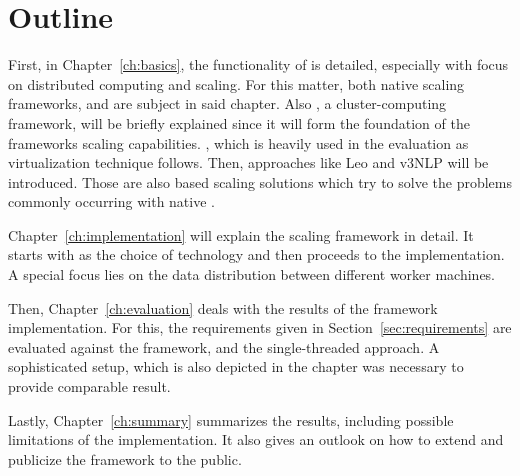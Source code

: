\section{Outline}
First, in Chapter~\ref{ch:basics}, the functionality of \uima{} is detailed, especially with focus on distributed computing and scaling. For this matter, both native \uima{} scaling frameworks, \uimaas{} and \cpe{} are subject in said chapter. Also \spark{}, a cluster-computing framework, will be briefly explained since it will form the foundation of the frameworks scaling capabilities. \docker{}, which is heavily used in the evaluation as virtualization technique follows. Then, approaches like Leo and v3NLP will be introduced. Those are also \uimaas{} based scaling solutions which try to solve the problems commonly occurring with native \uimaas{}.

Chapter~\ref{ch:implementation} will explain the scaling framework in detail. It starts with \spark{} as the choice of technology and then proceeds to the implementation. A special focus lies on the data distribution between different worker machines.

Then, Chapter~\ref{ch:evaluation} deals with the results of the framework implementation. For this, the requirements given in Section~\ref{sec:requirements} are evaluated against the framework, \uimaas{} and the single-threaded approach. A sophisticated setup, which is also depicted in the chapter was necessary to provide comparable result.

Lastly, Chapter~\ref{ch:summary} summarizes the results, including possible limitations of the implementation. It also gives an outlook on how to extend and publicize the framework to the public.